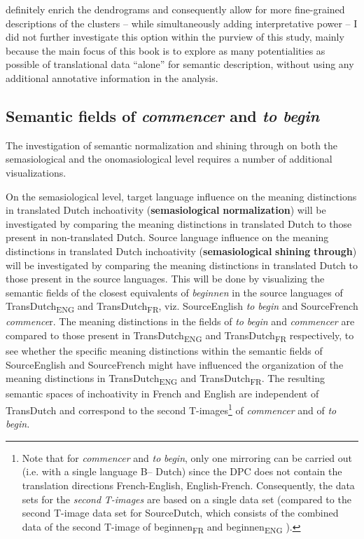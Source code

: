 definitely enrich the dendrograms and consequently allow for more fine-grained descriptions of the clusters – while simultaneously adding interpretative power – I did not further investigate this option within the purview of this study, mainly because the main focus of this book is to explore as many potentialities as possible of translational data ``alone'' for semantic description, without using any additional annotative information in the analysis.

\subsection{Semantic fields of \textit{commencer} and \textit{to begin}}
\label{sec:3.8.2}  
The investigation of semantic normalization and shining through on both the semasiological and the onomasiological level requires a number of additional visualizations.

On the semasiological level, target language influence on the meaning distinctions in translated Dutch inchoativity (\textbf{semasiological} \textbf{normalization}) will be investigated by comparing the meaning distinctions in translated Dutch to those present in non-translated Dutch. Source language influence on the meaning distinctions in translated Dutch inchoativity (\textbf{semasiological} \textbf{shining} \textbf{through}) will be investigated by comparing the meaning distinctions in translated Dutch to those present in the source languages. This will be done by visualizing the semantic fields of the closest equivalents of \textit{beginnen} in the source languages of TransDutch\textsubscript{ENG} and TransDutch\textsubscript{FR}, viz. SourceEnglish \textit{to} \textit{begin} and SourceFrench \textit{commence}r. The meaning distinctions in the fields of \textit{to} \textit{begin} and \textit{commencer} are compared to those present in TransDutch\textsubscript{ENG} and TransDutch\textsubscript{FR} respectively, to see whether the specific meaning distinctions within the semantic fields of SourceEnglish and SourceFrench might have influenced the organization of the meaning distinctions in TransDutch\textsubscript{ENG} and TransDutch\textsubscript{FR}. The resulting semantic spaces of inchoativity in French and English are independent of TransDutch and correspond to the second T-images\footnote{Note that for \textit{commencer} and \textit{to} \textit{begin}, only one mirroring can be carried out (i.e. with a single language B– Dutch) since the DPC does not contain the translation directions French-English, English-French. Consequently, the data sets for the \textit{second} \textit{T-images} are based on a single data set (compared to the second T-image data set for SourceDutch, which consists of the combined data of the second T-image of beginnen\textsubscript{FR} and beginnen\textsubscript{ENG} ).} of \textit{commencer} and of \textit{to} \textit{begin.}

